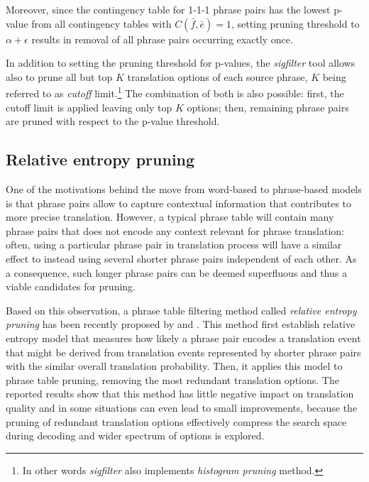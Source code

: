 Moreover, since the contingency table for 1-1-1 phrase pairs has the lowest p-value
from all contingency tables with $C(\bar{f},\bar{e}) = 1$, setting pruning threshold
to $\alpha + \epsilon$ results in removal of all phrase pairs occurring exactly once.

In addition to setting the pruning threshold for p-values, the \emph{sigfilter} tool
allows also to prune all but top $K$ translation options of each source phrase,
$K$ being referred to as \emph{cutoff} limit.\footnote{In other words \emph{sigfilter}
also implements \emph{histogram pruning} method.}
The combination of both is also possible: first, the cutoff limit is applied leaving
only top $K$ options; then, remaining phrase pairs are pruned with respect to the
p-value threshold.

\subsection{Relative entropy pruning}
\label{sec:relent-pruning}

One of the motivations behind the move from word-based to phrase-based models
is that phrase pairs allow to capture contextual information that contributes
to more precise translation.
However, a typical phrase table will contain many phrase pairs that does not
encode any context relevant for phrase translation: often, using a particular
phrase pair in translation process will have a similar effect to instead using
several shorter phrase pairs independent of each other.
As a consequence, such longer phrase pairs can be deemed superfluous and thus
a viable candidates for pruning.

Based on this observation, a phrase table filtering method called \emph{relative
entropy pruning} has been recently proposed by \citet{ling:relentfilter} and
\citet{zens:systcomp}.
This method first establish relative entropy model that measures how likely
a phrase pair encodes a translation event that might be derived from translation
events represented by shorter phrase pairs with the similar overall translation
probability. Then, it applies this model to phrase table pruning, removing
the most redundant translation options.
The reported results show that this method has little negative impact on
translation quality and in some situations can even lead to small improvements,
because the pruning of redundant translation options effectively compress
the search space during decoding and wider spectrum of options is explored.

